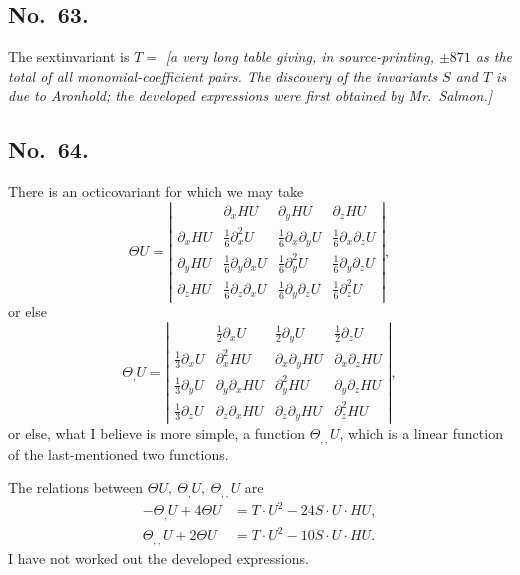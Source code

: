 \documentclass[11pt]{article}
\begin{document}
\subsection*{No.\ 63.}
The sextinvariant is $T =$ \textit{[a very long table giving, in source-printing, $\pm 871$ as the total of all monomial-coefficient pairs. The discovery of the invariants $S$ and $T$ is due to Aronhold; the developed expressions were first obtained by Mr.\ Salmon.]}

\subsection*{No.\ 64.}
There is an octicovariant for which we may take
\[
\Theta U =
\left|\begin{array}{cccc}
{} & \partial_x HU & \partial_y HU & \partial_z HU \\[2pt]
\partial_x HU & \frac16\partial_x^2 U & \frac16\partial_x\partial_y U & \frac16\partial_x\partial_z U \\[2pt]
\partial_y HU & \frac16\partial_y\partial_x U & \frac16\partial_y^2 U & \frac16\partial_y\partial_z U \\[2pt]
\partial_z HU & \frac16\partial_z\partial_x U & \frac16\partial_y\partial_z U & \frac16\partial_z^2 U
\end{array}\right| ,
\]
or else
\[
\Theta_{,}U =
\left|\begin{array}{cccc}
{} & \frac12\partial_x U & \frac12\partial_y U & \frac12\partial_z U \\[2pt]
\frac13\partial_x U & \partial_x^2 HU & \partial_x\partial_y HU & \partial_x\partial_z HU \\[2pt]
\frac13\partial_y U & \partial_y\partial_x HU & \partial_y^2 HU & \partial_y\partial_z HU \\[2pt]
\frac13\partial_z U & \partial_z\partial_x HU & \partial_z\partial_y HU & \partial_z^2 HU
\end{array}\right| ,
\]
or else, what I believe is more simple, a function $\Theta_{,,}U$, which is a linear function of the last-mentioned two functions.

\medskip

The relations between $\Theta U,\ \Theta_{,}U,\ \Theta_{,,}U$ are
\begin{align*}
-\Theta_{,}U + 4\Theta U &= T\cdot U^2 - 24S\cdot U\cdot HU, \\
\Theta_{,,}U + 2\Theta U &= T\cdot U^2 - 10S\cdot U\cdot HU.
\end{align*}
I have not worked out the developed expressions.
\end{document}
